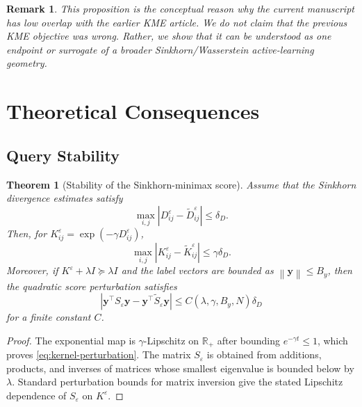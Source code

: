 \documentclass[11pt,a4paper]{article}
\newtheorem{theorem}{Theorem}
\newtheorem{remark}{Remark}
\newcommand{\R}{\mathbb{R}}
\newcommand{\norm}[1]{\left\lVert #1\right\rVert}
\newcommand{\abs}[1]{\left\lvert #1\right\rvert}
\begin{document}
\begin{remark}
This proposition is the conceptual reason why the current manuscript has low overlap with the earlier KME article. We do not claim that the previous KME objective was wrong. Rather, we show that it can be understood as one endpoint or surrogate of a broader Sinkhorn/Wasserstein active-learning geometry.
\end{remark}

\section{Theoretical Consequences}

\subsection{Query Stability}

\begin{theorem}[Stability of the Sinkhorn-minimax score]
\label{thm:stability}
Assume that the Sinkhorn divergence estimates satisfy
\begin{equation}
\max_{i,j}\abs{D^\varepsilon_{ij}-\widetilde D^\varepsilon_{ij}}\le \delta_D.
\end{equation}
Then, for $K^\varepsilon_{ij}=\exp(-\gamma D^\varepsilon_{ij})$,
\begin{equation}
\max_{i,j}\abs{K^\varepsilon_{ij}-\widetilde K^\varepsilon_{ij}}
\le \gamma \delta_D.
\label{eq:kernel-perturbation}
\end{equation}
Moreover, if $K^\varepsilon+\lambda I\succeq \lambda I$ and the label vectors are bounded as $\norm{\bm y}\le B_y$, then the quadratic score perturbation satisfies
\begin{equation}
\abs{\bm y^\top S_\varepsilon\bm y-\bm y^\top \widetilde S_\varepsilon\bm y}
\le C(\lambda,\gamma,B_y,N)\delta_D
\end{equation}
for a finite constant $C$.
\end{theorem}

\begin{proof}
The exponential map is $\gamma$-Lipschitz on $\R_+$ after bounding $e^{-\gamma t}\le 1$, which proves \eqref{eq:kernel-perturbation}. The matrix $S_\varepsilon$ is obtained from additions, products, and inverses of matrices whose smallest eigenvalue is bounded below by $\lambda$. Standard perturbation bounds for matrix inversion give the stated Lipschitz dependence of $S_\varepsilon$ on $K^\varepsilon$.
\end{proof}
\end{document}
